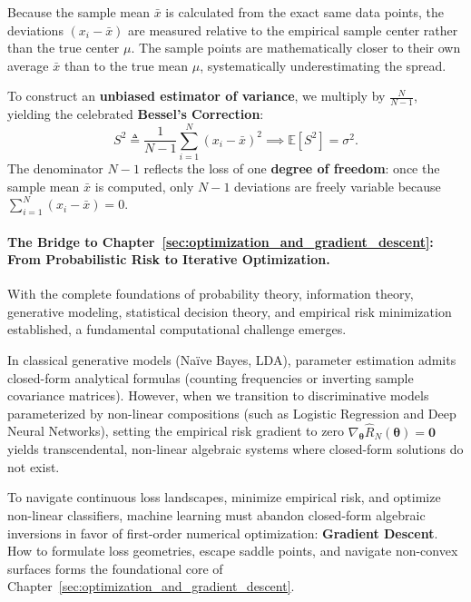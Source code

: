 Because the sample mean $\bar{x}$ is calculated from the exact same data points, the deviations $(x_i - \bar{x})$ are measured relative to the empirical sample center rather than the true center $\mu$. The sample points are mathematically closer to their own average $\bar{x}$ than to the true mean $\mu$, systematically underestimating the spread.

To construct an \textbf{unbiased estimator of variance}, we multiply by $\frac{N}{N-1}$, yielding the celebrated \textbf{Bessel's Correction}:
\begin{equation}
S^2 \triangleq \frac{1}{N - 1} \sum_{i=1}^N (x_i - \bar{x})^2 \implies \mathbb{E}[S^2] = \sigma^2.
\label{eq:bessels_correction_unbiased}
\end{equation}
The denominator $N - 1$ reflects the loss of one \textbf{degree of freedom}: once the sample mean $\bar{x}$ is computed, only $N - 1$ deviations are freely variable because $\sum_{i=1}^N (x_i - \bar{x}) = 0$.

\paragraph{The Bridge to Chapter~\ref{sec:optimization_and_gradient_descent}: From Probabilistic Risk to Iterative Optimization.}
With the complete foundations of probability theory, information theory, generative modeling, statistical decision theory, and empirical risk minimization established, a fundamental computational challenge emerges.

In classical generative models (Naïve Bayes, LDA), parameter estimation admits closed-form analytical formulas (counting frequencies or inverting sample covariance matrices). However, when we transition to discriminative models parameterized by non-linear compositions (such as Logistic Regression and Deep Neural Networks), setting the empirical risk gradient to zero $\nabla_{\boldsymbol{\theta}} \hat{R}_N(\boldsymbol{\theta}) = \mathbf{0}$ yields transcendental, non-linear algebraic systems where closed-form solutions do not exist.

To navigate continuous loss landscapes, minimize empirical risk, and optimize non-linear classifiers, machine learning must abandon closed-form algebraic inversions in favor of first-order numerical optimization: \textbf{Gradient Descent}. How to formulate loss geometries, escape saddle points, and navigate non-convex surfaces forms the foundational core of Chapter~\ref{sec:optimization_and_gradient_descent}.

